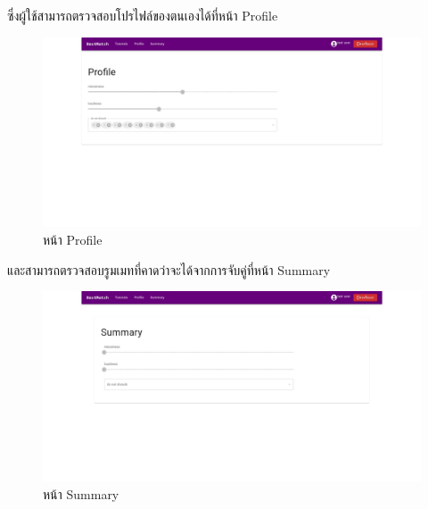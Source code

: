 ซึ่งผู้ใช้สามารถตรวจสอบโปรไฟล์ของตนเองได้ที่หน้า Profile
\begin{figure}[h]
  \begin{center}
    \includegraphics[width=\linewidth]{photo/web/student/profile.jpeg}
  \end{center}
  \caption{หน้า Profile}
\end{figure}
%
\newline
และสามารถตรวจสอบรูมเมทที่คาดว่าจะได้จากการจับคู่ที่หน้า Summary
\begin{figure}[h]
  \begin{center}
    \includegraphics[width=\linewidth]{photo/web/student/summary.jpeg}
  \end{center}
  \caption{หน้า Summary}
\end{figure}